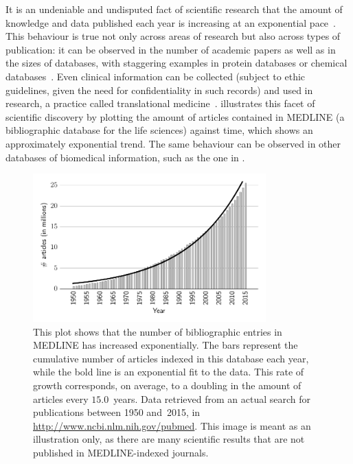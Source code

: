 It is an undeniable and undisputed fact of scientific research that the amount of knowledge and data published each year is increasing at an exponential pace~\citep{Larsen2010}. This behaviour is true not only across areas of research but also across types of publication: it can be observed in the number of academic papers as well as in the sizes of databases, with staggering examples in protein databases \citep[\eg][]{Uniprot2010} or chemical databases~\citep{Williams2008}. Even clinical information can be collected (subject to ethic guidelines, given the need for confidentiality in such records) and used in research, a practice called translational medicine~\citep{Nalichowski2006,Wehling2008}.  illustrates this facet of scientific discovery by plotting the amount of articles contained in MEDLINE (a bibliographic database for the life sciences) against time, which shows an approximately exponential trend. The same behaviour can be observed in other databases of biomedical information, such as the one in .

\begin{figure}
    \centering
    \includegraphics[width=0.8\textwidth]{images/medline-stats.pdf}
    \caption[Yearly size of MEDLINE from 1950 to~2015]{This plot shows that the number of bibliographic entries in MEDLINE has increased exponentially. The bars represent the cumulative number of articles indexed in this database each year, while the bold line is an exponential fit to the data. This rate of growth corresponds, on average, to a doubling in the amount of articles every $15.0$~years. Data retrieved from an actual search for publications between 1950 and~2015, in \url{http://www.ncbi.nlm.nih.gov/pubmed}. This image is meant as an illustration only, as there are many scientific results that are not published in MEDLINE-indexed journals.}
    \label{fig:medline-growth}
\end{figure}

